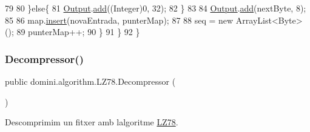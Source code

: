 \begin{DoxyCode}
79 
80                 \}\textcolor{keywordflow}{else}\{
81                     \hyperlink{classdomini_1_1algorithm_1_1Algorithm_a4de9955411c656325adc391ef570c082}{Output}.\hyperlink{classpersistencia_1_1output_1_1Ctrl__Output_a8c5aa5a6acb5259faeb1c05c71ddd21c}{add}((Integer)0, 32);
82                 \}
83                 
84                 \hyperlink{classdomini_1_1algorithm_1_1Algorithm_a4de9955411c656325adc391ef570c082}{Output}.\hyperlink{classpersistencia_1_1output_1_1Ctrl__Output_a8c5aa5a6acb5259faeb1c05c71ddd21c}{add}(nextByte, 8);
85 
86                 map.\hyperlink{classdomini_1_1utils_1_1Trie_a3599001d9b056f0b54ab7eabb9d3510b}{insert}(novaEntrada, punterMap);
87 
88                 seq = \textcolor{keyword}{new} ArrayList<Byte>();
89                 punterMap++;
90             \}
91         \}
92     \}
\end{DoxyCode}
\mbox{\label{classdomini_1_1algorithm_1_1LZ78_a0872cb8224ffd478b992490df06f6ecf}} 
\subsubsection{\texorpdfstring{Decompressor()}{Decompressor()}}
{\footnotesize\ttfamily public domini.\+algorithm.\+L\+Z78.\+Decompressor (\begin{DoxyParamCaption}{ }\end{DoxyParamCaption})\hspace{0.3cm}{\ttfamily [inline]}}



Descomprimim un fitxer amb l\textquotesingle{}algoritme \hyperlink{classdomini_1_1algorithm_1_1LZ78}{L\+Z78}. 


